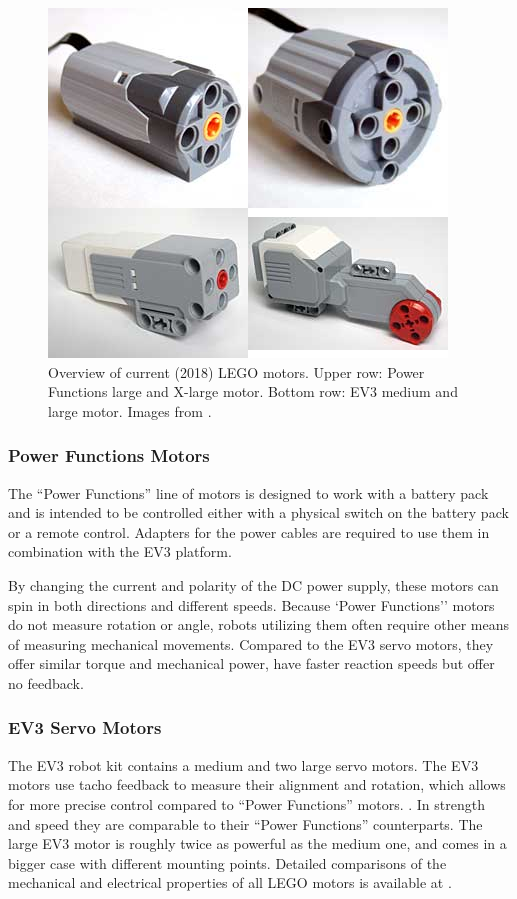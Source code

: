 \documentclass[11pt, a4paper]{article}
\begin{document}
\begin{figure}
\centering
\includegraphics[width=0.4\linewidth]{images/motors}
\caption{Overview of current (2018) LEGO motors. Upper row: Power Functions large and X-large motor. Bottom row: EV3 medium and large motor. Images from \cite{motor_comparison}.}
\label{fig:motors}
\end{figure}

\subsubsection*{Power Functions Motors}
The ``Power Functions'' line of motors is designed to work with a battery pack and is intended to be controlled either with a physical switch on the battery pack or a remote control. Adapters for the power cables are required to use them in combination with the EV3 platform. \cite{power_fun}

By changing the current and polarity of the DC power supply, these motors can spin in both directions and different speeds. Because `Power Functions'' motors do not measure rotation or angle, robots utilizing them often require other means of measuring mechanical movements. Compared to the EV3 servo motors, they offer similar torque and mechanical power, have faster reaction speeds but offer no feedback. \cite{motor_comparison}


\subsubsection*{EV3 Servo Motors}
The EV3 robot kit contains a medium and two large servo motors. The EV3 motors use tacho feedback to measure their alignment and rotation, which allows for more precise control compared to ``Power Functions'' motors. \cite{Servo_Motor}. In strength and speed they are comparable to their ``Power Functions'' counterparts. The large EV3 motor is roughly twice as powerful as the medium one, and comes in a bigger case with different mounting points. Detailed comparisons of the mechanical and electrical properties of all LEGO motors is available at \cite{motor_comparison}.
\end{document}
